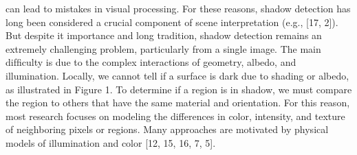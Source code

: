 {{can lead to mistakes in visual processing. For these reasons,
shadow detection has long been considered a crucial component of scene interpretation (e.g., [17, 2]). But despite it
importance and long tradition, shadow detection remains an
extremely challenging problem, particularly from a single
image.
The main difﬁculty is due to the complex interactions of
geometry, albedo, and illumination. Locally, we cannot tell
if a surface is dark due to shading or albedo, as illustrated
in Figure 1. To determine if a region is in shadow, we must
compare the region to others that have the same material and
orientation. For this reason, most research focuses on modeling 
the differences in color, intensity, and texture of neighboring pixels or regions. 
Many approaches are motivated by
physical models of illumination and color [12, 15, 16, 7, 5].

}}
